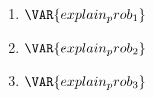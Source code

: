 \begin{enumerate}

    \item $\VAR{explain_prob_1}$

    \vfill
    \begin{ansenv}
    \end{ansenv}
    \vfill

    \item $\VAR{explain_prob_2}$

    \vfill
    \begin{ansenv}
    \end{ansenv}
    \vfill

    \item $\VAR{explain_prob_3}$

    \vfill
    \begin{ansenv}
    \end{ansenv}
    \vfill
\end{enumerate}